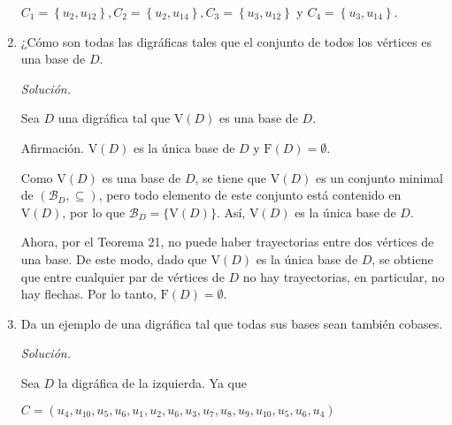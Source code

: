 \documentclass[12pt, fleqn]{article}
\newcommand{\V}[1]{\mathrm{V} \! \left( #1 \right)}
\newcommand{\F}[1]{\mathrm{F} \! \left( #1 \right)}
\begin{document}
\begin{enumerate}
		$ C_1 = \left\lbrace u_2, u_{12} \right\rbrace, C_2 = \left\lbrace u_2, u_{14} \right\rbrace, C_3 = \left\lbrace u_3, u_{12} \right\rbrace $ y $ C_4 = \left\lbrace u_3, u_{14} \right\rbrace $.
		
		\vspace{3mm}
		
		\item ¿Cómo son todas las digráficas tales que el conjunto de todos los vértices es una base de $D$.
		
		\emph{Solución.}

		Sea $D$ una digráfica tal que $ \V{D} $ es una base de $D$.

		Afirmación. $ \V{D} $ es la única base de $D$ y $ \F{D} = \emptyset $.

		Como $ \V{D} $ es una base de $D$, se tiene que $ \V{D} $ es un conjunto minimal de $ \left( \mathcal{B}_D, \subseteq \right) $, pero todo elemento de este conjunto está contenido en $ \V{D} $, por lo que $ \mathcal{B}_D = \lbrace \V{D} \rbrace $. Así, $ \V{D} $ es la única base de $D$.

		Ahora, por el Teorema 21, no puede haber trayectorias entre dos vértices de una base. De este modo, dado que $ \V{D} $ es la única base de $D$, se obtiene que entre cualquier par de vértices de $D$ no hay trayectorias, en particular, no hay flechas. Por lo tanto, $ \F{D} = \emptyset $.
		
		\item Da un ejemplo de una digráfica tal que todas sus bases sean también cobases.
		
		\begin{minipage}[h]{0.62\linewidth}
			\setlength{\parskip}{3mm}
			\emph{Solución.}

			Sea $D$ la digráfica de la izquierda. Ya que

			$ C = \left( u_4, u_{10}, u_5, u_6, u_1, u_2, u_6, u_3, u_7, u_8, u_9, u_{10}, u_5, u_6, u_4 \right) $ 
			

\end{minipage}
\end{enumerate}
\end{document}
